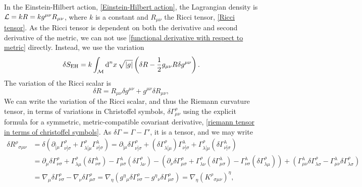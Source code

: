 In the Einstein-Hilbert action, \autoref{Einstein-Hilbert action}, the Lagrangian density is $\mathcal{L} = k R = k g^{\mu \nu} R_{\mu \nu}$, where $k$ is a constant and $R_{\mu \nu}$ the Ricci tensor, \autoref{Ricci tensor}.
As the Ricci tensor is dependent on both the derivative and second derivative of the metric,  we can not use \autoref{functional derivative with respect to metric} directly.
Instead, we use the variation
%
\begin{equation}
    \delta S_{\text{EH}} = k \int_{\mathcal{M}} \text{d}^n x \, \sqrt{|g|}
    \left( \delta R - \frac{1}{2} g_{\mu \nu} R \delta g^{\mu \nu} \right).
\end{equation}
%
The variation of the Ricci scalar is
%
\begin{equation}
    \delta R = R_{\mu \nu} \delta g^{\mu \nu} + g^{\mu \nu} \delta R_{\mu \nu},
\end{equation}
%
We can write the variation of the Ricci scalar, and thus the Riemann curvature tensor, in terms of variations in Christoffel symbols, $\delta \Gamma^{\rho}_{\mu \nu}$ using the explicit formula for a symmetric, metric-compatible covariant derivative, \autoref{riemann tensor in terms of christoffel symbols}.
As $\delta \Gamma = \Gamma - \Gamma'$, it is a tensor, and we may write
%
\begin{align*}
    \delta R^\rho{}_{\sigma \mu \nu} 
    & = \delta(\partial_{[\mu} \Gamma^\rho_{\nu] \sigma} + \Gamma^\rho_{\lambda [\mu} \Gamma^\lambda_{\nu] \sigma})
    = \partial_{[\mu} \delta \Gamma^\rho_{\nu] \sigma} + (\delta \Gamma^\rho_{\lambda [\mu}) \Gamma^\lambda_{\nu] \sigma} + \Gamma^\rho_{\lambda [\mu}(\delta \Gamma^\lambda_{\nu] \sigma}) \\
    & = \partial_{\mu} \delta \Gamma^\rho_{\nu \sigma}  + \Gamma^\rho_{\lambda \mu}(\delta \Gamma^\lambda_{\nu \sigma}) - \Gamma^\lambda_{\mu \sigma}   (\delta \Gamma^\rho_{\lambda \nu}) - \left( \partial_{\nu} \delta \Gamma^\rho_{\mu \sigma}  + \Gamma^\rho_{\lambda \nu}(\delta \Gamma^\lambda_{\mu \sigma}) - \Gamma^\lambda_{\nu \sigma}   (\delta \Gamma^\rho_{\lambda \mu}) \right) + (\Gamma^{\lambda}_{\mu\nu}\delta\Gamma^\rho_{\lambda \sigma} - \Gamma^{\lambda}_{\mu\nu}\delta\Gamma^\rho_{\lambda \sigma}) \\
    & = \nabla_{\mu}\delta \Gamma^\rho_{\nu \sigma} - \nabla_{\nu}\delta \Gamma^\rho_{\mu \sigma}
     = \nabla_\eta \left(g^\eta{}_{\mu} \delta\Gamma^\rho_{\nu \sigma} - g^\eta{}_{\nu} \delta\Gamma^\rho_{\mu \sigma} \right) 
    = \nabla_\eta (K^\rho{}_{\sigma \mu \nu})^\eta,
\end{align*}
